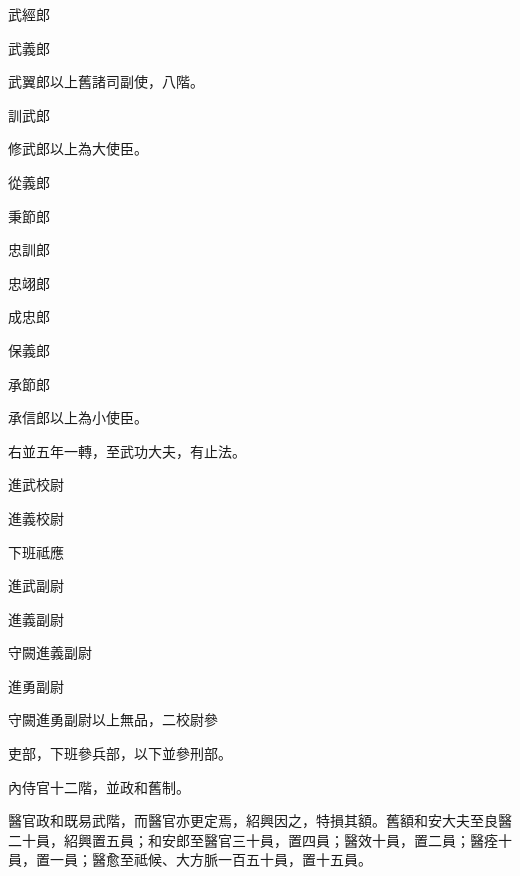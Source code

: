 \begin{pinyinscope}
 武經郎



 武義郎



 武翼郎以上舊諸司副使，八階。



 訓武郎



 修武郎以上為大使臣。



 從義郎



 秉節郎



 忠訓郎



 忠翊郎



 成忠郎



 保義郎



 承節郎



 承信郎以上為小使臣。



 右並五年一轉，至武功大夫，有止法。



 進武校尉



 進義校尉



 下班祗應



 進武副尉



 進義副尉



 守闕進義副尉



 進勇副尉



 守闕進勇副尉以上無品，二校尉參



 吏部，下班參兵部，以下並參刑部。



 內侍官十二階，並政和舊制。



 醫官政和既易武階，而醫官亦更定焉，紹興因之，特損其額。舊額和安大夫至良醫二十員，紹興置五員；和安郎至醫官三十員，置四員；醫效十員，置二員；醫痊十員，置一員；醫愈至祗候、大方脈一百五十員，置十五員。




\end{pinyinscope}
